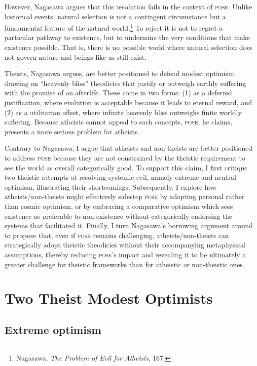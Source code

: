 However, Nagasawa argues that this resolution fails in the context of
\textsc{pose}. Unlike historical events, natural selection is not a contingent
circumstance but a fundamental feature of the natural world.\footnote{Nagasawa,
  \emph{The Problem of Evil for Atheists}, 167.} To reject it is not to
regret a particular pathway to existence, but to undermine the very
conditions that make existence possible. That is, there is no possible
world where natural selection does not govern nature and beings like us
still exist.

Theists, Nagasawa argues, are better positioned to defend modest
optimism, drawing on ``heavenly bliss'' theodicies that justify or
outweigh earthly suffering with the promise of an afterlife. These come
in two forms: (1) as a deferred justification, where evolution is
acceptable because it leads to eternal reward, and (2) as a utilitarian
offset, where infinite heavenly bliss outweighs finite worldly
suffering. Because atheists cannot appeal to such concepts, \textsc{pose}, he
claims, presents a more serious problem for atheists.

Contrary to Nagasawa, I argue that atheists and non-theists are better
positioned to address \textsc{pose} because they are not constrained by the
theistic requirement to see the world as overall categorically good. To
support this claim, I first critique two theistic attempts at resolving
systemic evil, namely extreme and neutral optimism, illustrating their
shortcomings. Subsequently, I explore how atheists/non-theists might
effectively sidestep \textsc{pose} by adopting personal rather than cosmic
optimism, or by embracing a comparative optimism which sees existence as
preferable to non-existence without categorically endorsing the systems
that facilitated it. Finally, I turn Nagasawa's borrowing argument
around to propose that, even if \textsc{pose} remains challenging,
atheists/non-theists can strategically adopt theistic theodicies without
their accompanying metaphysical assumptions, thereby reducing \textsc{pose}'s
impact and revealing it to be ultimately a greater challenge for
theistic frameworks than for atheistic or non-theistic ones.

\section{Two Theist Modest Optimists}
\subsection{Extreme optimism}


